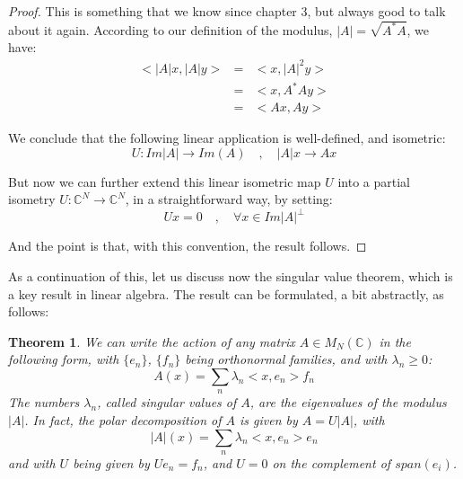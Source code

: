 \documentclass[12pt]{amsbook}
\newtheorem{theorem}{Theorem}[chapter]
\begin{document}
\begin{proof}
This is something that we know since chapter 3, but always good to talk about it again. According to our definition of the modulus, $|A|=\sqrt{A^*A}$, we have:
\begin{eqnarray*}
<|A|x,|A|y>
&=&<x,|A|^2y>\\
&=&<x,A^*Ay>\\
&=&<Ax,Ay>
\end{eqnarray*}

We conclude that the following linear application is well-defined, and isometric:
$$U:Im|A|\to Im(A)\quad,\quad 
|A|x\to Ax$$

But now we can further extend this linear isometric map $U$ into a partial isometry $U:\mathbb C^N\to\mathbb C^N$, in a straightforward way, by setting:
$$Ux=0\quad,\quad\forall x\in Im|A|^\perp$$

And the point is that, with this convention, the result follows. 
\end{proof}

As a continuation of this, let us discuss now the singular value theorem, which is a key result in linear algebra. The result can be formulated, a bit abstractly, as follows:

\begin{theorem}
We can write the action of any matrix $A\in M_N(\mathbb C)$ in the following form, with $\{e_n\}$, $\{f_n\}$ being orthonormal families, and with $\lambda_n\geq 0$:
$$A(x)=\sum_n\lambda_n<x,e_n>f_n$$
The numbers $\lambda_n$, called singular values of $A$, are the eigenvalues of the modulus $|A|$. In fact, the polar decomposition of $A$ is given by $A=U|A|$, with
$$|A|(x)=\sum_n\lambda_n<x,e_n>e_n$$
and with $U$ being given by $Ue_n=f_n$, and $U=0$ on the complement of $span(e_i)$.
\end{theorem}
\end{document}
